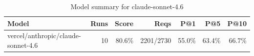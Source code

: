\begin{table}[htbp]
\centering
\begin{tabular}{lrrrrrr}
\toprule
Model & Runs & Score & Reqs & P@1 & P@5 & P@10 \\
\midrule
vercel/anthropic/claude-sonnet-4.6 & 10 & 80.6\% & 2201/2730 & 55.0\% & 63.4\% & 66.7\% \\
\bottomrule
\end{tabular}
\caption{Model summary for claude-sonnet-4.6}
\end{table}
